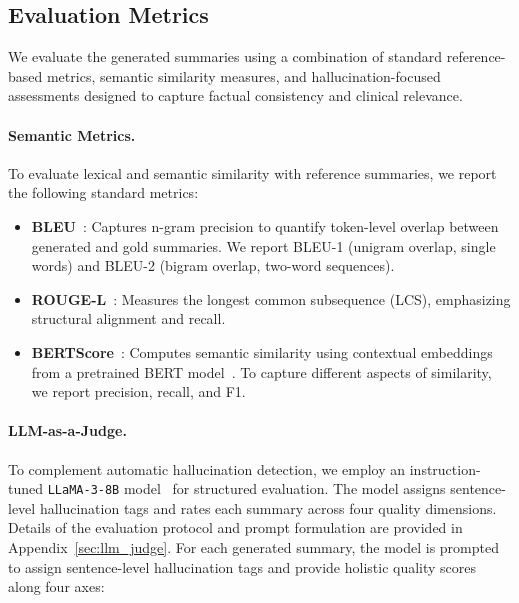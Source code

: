 \documentclass{article}
\begin{document}
\subsection{Evaluation Metrics}
\label{sec:metrics}
We evaluate the generated summaries using a combination of standard reference-based metrics, semantic similarity measures, and hallucination-focused assessments designed to capture factual consistency and clinical relevance.

\paragraph{Semantic Metrics.}
To evaluate lexical and semantic similarity with reference summaries, we report the following standard metrics:

\begin{itemize}
\item \textbf{BLEU}~\citep{papineni2002bleu}: Captures n-gram precision to quantify token-level overlap between generated and gold summaries. We report BLEU-1 (unigram overlap, single words) and BLEU-2 (bigram overlap, two-word sequences).
\item \textbf{ROUGE-L}~\citep{lin2004rouge}: Measures the longest common subsequence (LCS), emphasizing structural alignment and recall.
\item \textbf{BERTScore}~\citep{zhang2019bertscore}: Computes semantic similarity using contextual embeddings from a pretrained BERT model~\citep{devlin2019bert}. To capture different aspects of similarity, we report precision, recall, and F1.
\end{itemize}



\paragraph{LLM-as-a-Judge.}
To complement automatic hallucination detection, we employ an instruction-tuned \texttt{LLaMA-3-8B} model~\citep{grattafiori2024llama3} for structured evaluation. The model assigns sentence-level hallucination tags and rates each summary across four quality dimensions. Details of the evaluation protocol and prompt formulation are provided in Appendix~\ref{sec:llm_judge}. For each generated summary, the model is prompted to assign sentence-level hallucination tags and provide holistic quality scores along four axes:
\end{document}
